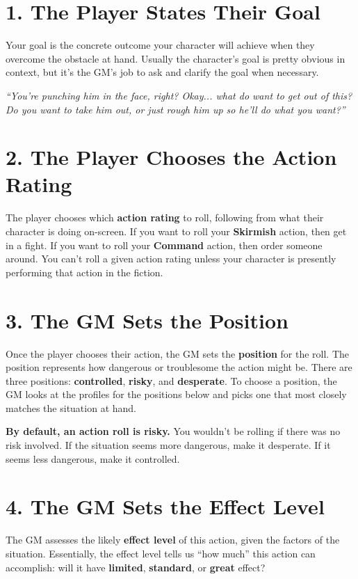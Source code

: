 \documentclass[11pt,fleqn,a5paper]{book}
\newcommand{\gameterm}[1]{\textbf{#1}}
\begin{document}
\section{1. The Player States Their Goal}

Your goal is the concrete outcome your character will achieve when they overcome the obstacle at hand. Usually the character’s goal is pretty obvious in context, but it’s the GM’s job to ask and clarify the goal when necessary.

\emph{“You’re punching him in the face, right? Okay... what do want to get out of this? Do you want to take him out, or just rough him up so he’ll do what you want?”}

\section{2. The Player Chooses the Action Rating}

The player chooses which \textbf{action rating} to roll, following from what their character is doing on-screen. If you want to roll your \gameterm{Skirmish}  action, then get in a fight. If you want to roll your \gameterm{Command}  action, then order someone around. You can’t roll a given action rating unless your character is presently performing that action in the fiction.

\section{3. The GM Sets the Position}

Once the player chooses their action, the GM sets the \textbf{position} for the roll. The position represents how dangerous or troublesome the action might be. There are three positions: \textbf{controlled}, \textbf{risky}, and \textbf{desperate}. To choose a position, the GM looks at the profiles for the positions below and picks one that most closely matches the situation at hand.

\textbf{By default, an action roll is risky.} You wouldn’t be rolling if there was no risk involved. If the situation seems more dangerous, make it desperate. If it seems less dangerous, make it controlled.

\section{4. The GM Sets the Effect Level}

The GM assesses the likely \textbf{effect level} of this action, given the factors of the situation. Essentially, the effect level tells us “how much” this action can accomplish: will it have \textbf{limited}, \textbf{standard}, or \textbf{great} effect?
\end{document}
